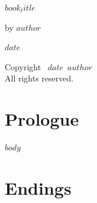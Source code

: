 \documentclass[12pt]{memoir}
\def\booktitle{$book_title$}
\def\bookauthor{$author$}
\def\bookdate{$date$}
\begin{document}
\thispagestyle{empty}
\begin{center}
\vspace*{1in}
{\Huge\bfseries\booktitle\par}
\vspace{1in}
{\Large by \bookauthor\par}
\vfill
{\large\bookdate}
\end{center}

\clearpage
\thispagestyle{empty}
\vspace*{\fill}
\begin{center}
Copyright \textcopyright\ \bookdate\ \bookauthor\\
All rights reserved.
\end{center}
\vspace*{\fill}

\clearpage
\chapter*{Prologue}

$body$

\clearpage
\chapter*{Endings}
\end{document}
